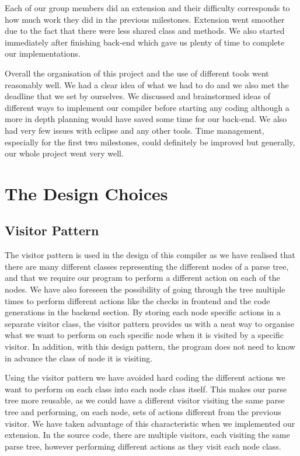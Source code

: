 \documentclass[11pt]{article}
\begin{document}
\medskip

Each of our group members did an extension and their difficulty corresponds to how much work they did in the previous milestones. Extension went smoother due to the fact that there were less shared class and methods. We also started immediately after finishing back-end which gave us plenty of time to complete our implementations.

\medskip

Overall the organisation of this project and the use of different tools went reasonably well. We had a clear idea of what we had to do and we also met the deadline that we set by ourselves. We discussed and brainstormed ideas of different ways to implement our compiler before starting any coding although a more in depth planning would have saved some time for our back-end. We also had very few issues with eclipse and any other tools. Time management, especially for the first two milestones, could definitely be improved but generally, our whole project went very well. 

\section{The Design Choices}

\subsection{Visitor Pattern}

The visitor pattern is used in the design of this compiler as we have realised that there are many different classes representing the different nodes of a parse tree, and that we require our program to perform a different action on each of the nodes. We have also foreseen the possibility of going through the tree multiple times to perform different actions like the checks in frontend and the code generations in the backend section. By storing each node specific actions in a separate visitor class, the visitor pattern provides us with a neat way to organise what we want to perform on each specific node when it is visited by a specific visitor. In addition, with this design pattern, the program does not need to know in advance the class of node it is visiting. 

\medskip

Using the visitor pattern we have avoided hard coding the different actions we want to perform on each class into each node class itself. This makes our parse tree more reusable, as we could have a different visitor visiting the same parse tree and performing, on each node, sets of actions different from the previous visitor. We have taken advantage of this characteristic when we implemented our extension. In the source code, there are multiple visitors, each visiting the same parse tree, however performing different actions as they visit each node class. 
\end{document}
